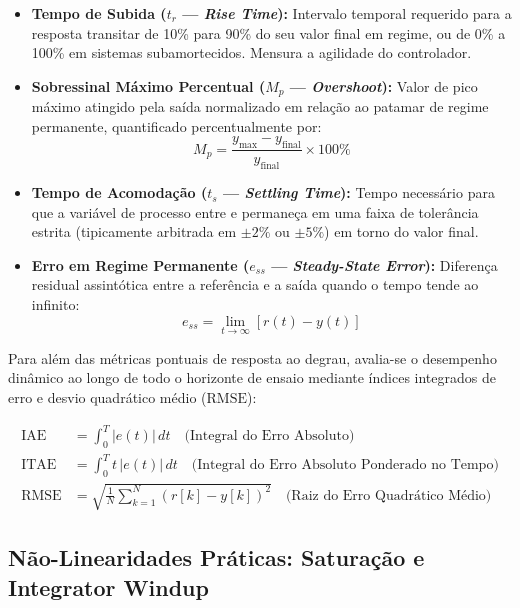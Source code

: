 \begin{itemize}
    \item \textbf{Tempo de Subida ($t_r$ --- \textit{Rise Time}):} Intervalo temporal requerido para a resposta transitar de 10\% para 90\% do seu valor final em regime, ou de 0\% a 100\% em sistemas subamortecidos. Mensura a agilidade do controlador.
    \item \textbf{Sobressinal Máximo Percentual ($M_p$ --- \textit{Overshoot}):} Valor de pico máximo atingido pela saída normalizado em relação ao patamar de regime permanente, quantificado percentualmente por:
    \begin{equation}
        M_p = \frac{y_{\max} - y_{\text{final}}}{y_{\text{final}}} \times 100\%
        \label{eq:overshoot}
    \end{equation}
    \item \textbf{Tempo de Acomodação ($t_s$ --- \textit{Settling Time}):} Tempo necessário para que a variável de processo entre e permaneça em uma faixa de tolerância estrita (tipicamente arbitrada em $\pm 2\%$ ou $\pm 5\%$) em torno do valor final.
    \item \textbf{Erro em Regime Permanente ($e_{ss}$ --- \textit{Steady-State Error}):} Diferença residual assintótica entre a referência e a saída quando o tempo tende ao infinito:
    \begin{equation}
        e_{ss} = \lim_{t \to \infty} [r(t) - y(t)]
        \label{eq:erro_regime}
    \end{equation}
\end{itemize}

Para além das métricas pontuais de resposta ao degrau, avalia-se o desempenho dinâmico ao longo de todo o horizonte de ensaio mediante índices integrados de erro e desvio quadrático médio ($\text{RMSE}$):

\begin{align}
    \text{IAE} &= \int_{0}^{T} |e(t)| \, dt \quad \text{(Integral do Erro Absoluto)} \label{eq:iae} \\
    \text{ITAE} &= \int_{0}^{T} t \, |e(t)| \, dt \quad \text{(Integral do Erro Absoluto Ponderado no Tempo)} \label{eq:itae} \\
    \text{RMSE} &= \sqrt{\frac{1}{N} \sum_{k=1}^{N} \left(r[k] - y[k]\right)^2} \quad \text{(Raiz do Erro Quadrático Médio)} \label{eq:rmse}
\end{align}

\subsection{Não-Linearidades Práticas: Saturação e Integrator Windup}
\label{subsec:saturacao_windup}

